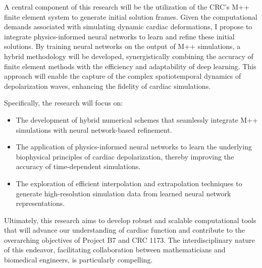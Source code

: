 \documentclass[10pt, a4paper]{article}
\begin{document}
	A central component of this research will be the utilization of the CRC's M++ finite element system to generate initial solution frames. Given the computational demands associated with simulating dynamic cardiac deformations, I propose to integrate physics-informed neural networks to learn and refine these initial solutions. By training neural networks on the output of M++ simulations, a hybrid methodology will be developed, synergistically combining the accuracy of finite element methods with the efficiency and adaptability of deep learning. This approach will enable the capture of the complex spatiotemporal dynamics of depolarization waves, enhancing the fidelity of cardiac simulations.
	
	Specifically, the research will focus on:
	\begin{itemize}
		\item The development of hybrid numerical schemes that seamlessly integrate M++ simulations with neural network-based refinement.
		\item The application of physics-informed neural networks to learn the underlying biophysical principles of cardiac depolarization, thereby improving the accuracy of time-dependent simulations.
		\item The exploration of efficient interpolation and extrapolation techniques to generate high-resolution simulation data from learned neural network representations.
	\end{itemize}
	
	Ultimately, this research aims to develop robust and scalable computational tools that will advance our understanding of cardiac function and contribute to the overarching objectives of Project B7 and CRC 1173. The interdisciplinary nature of this endeavor, facilitating collaboration between mathematicians and biomedical engineers, is particularly compelling.
	

	
	

		
\end{document}
